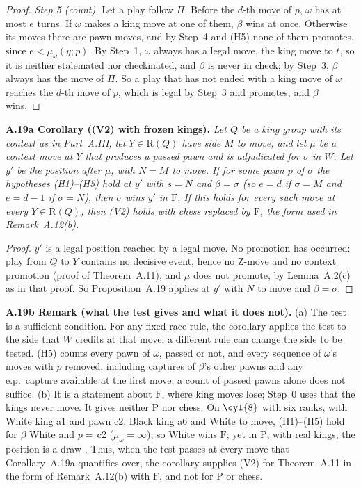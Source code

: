 \begin{proof}
\emph{Step 5 (count).} Let a play follow $\Pi$. Before the $d$-th move of $p$, $\omega$ has at most $e$ turns. If
$\omega$ makes a king move at one of them, $\beta$ wins at once. Otherwise its moves there are pawn moves, and by Step~4
and (H5) none of them promotes, since $e<\mu_\omega(y;p)$. By Step~1, $\omega$ always has a legal move, the king move to
$t$, so it is neither stalemated nor checkmated, and $\beta$ is never in check; by Step~3, $\beta$ always has the move of
$\Pi$. So a play that has not ended with a king move of $\omega$ reaches the $d$-th move of $p$, which is legal by Step~3
and promotes, and $\beta$ wins.
\end{proof}

\textbf{A.19a Corollary ((V2) with frozen kings).} \emph{Let $Q$ be a king group with its context as in Part~A.III, let
$Y\in\mathrm{R}(Q)$ have side $M$ to move, and let $\mu$ be a context move at $Y$ that produces a passed pawn and is
adjudicated for $\sigma$ in $W$. Let $y'$ be the position after $\mu$, with $N=\bar M$ to move. If for some pawn $p$ of
$\sigma$ the hypotheses (H1)--(H5) hold at $y'$ with $s=N$ and $\beta=\sigma$ (so $e=d$ if $\sigma=M$ and $e=d-1$ if
$\sigma=N$), then $\sigma$ wins $y'$ in $\mathrm{F}$. If this holds for every such move at every $Y\in\mathrm{R}(Q)$, then
(V2) holds with chess replaced by $\mathrm{F}$, the form used in Remark~A.12(b).}

\begin{proof}
$y'$ is a legal position reached by a legal move. No promotion has occurred: play from $Q$ to $Y$ contains no decisive
event, hence no Z-move and no context promotion (proof of Theorem~A.11), and $\mu$ does not promote, by Lemma~A.2(c) as
in that proof. So Proposition~A.19 applies at $y'$ with $N$ to move and $\beta=\sigma$.
\end{proof}

\textbf{A.19b Remark (what the test gives and what it does not).} (a) The test is a sufficient condition. For any
fixed race rule, the corollary applies the test to the side that $W$ credits at that move; a different rule can change
the side to be tested. (H5) counts every pawn of $\omega$, passed or not, and every sequence of $\omega$'s moves with $p$
removed, including captures of $\beta$'s other pawns and any e.p.\ capture available at the first move; a count of
passed pawns alone does not suffice. (b) It is a statement about $\mathrm{F}$, where king moves lose; Step~0 uses that the kings never move. It gives
neither $\mathrm{P}$ nor chess. On $\cyl{8}$ with six ranks, with White king a1 and pawn c2, Black king a6 and White to
move, (H1)--(H5) hold for $\beta$ White and $p=$\,c2 ($\mu_\omega=\infty$), so White wins $\mathrm{F}$; yet in
$\mathrm{P}$, with real kings, the position is a draw . Thus, when the test passes at
every move that Corollary~A.19a quantifies over, the corollary supplies (V2) for Theorem~A.11 in the form of Remark~A.12(b) with $\mathrm{F}$, and not
for $\mathrm{P}$ or chess.
